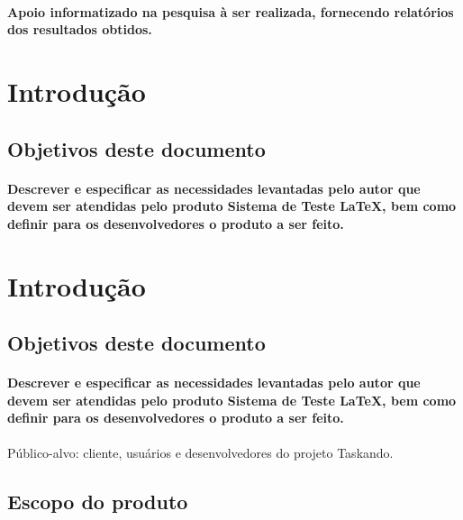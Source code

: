			\paragraph{Apoio informatizado na pesquisa à ser realizada, fornecendo relatórios dos resultados obtidos.}
		
	
\newpage

\section{Introdução}
	\subsection{Objetivos deste documento}
		\paragraph{Descrever e especificar as necessidades levantadas pelo autor que devem ser atendidas pelo produto Sistema de Teste LaTeX, bem como definir para os desenvolvedores o produto a ser feito.}


\newpage

\section{Introdução}
	\subsection{Objetivos deste documento}
		\paragraph{Descrever e especificar as necessidades levantadas pelo autor que devem ser atendidas pelo produto Sistema de Teste LaTeX, bem como definir para os desenvolvedores o produto a ser feito.}
\paragraph{}Público-alvo: cliente, usuários e desenvolvedores do projeto Taskando.
	\subsection{Escopo do produto}
